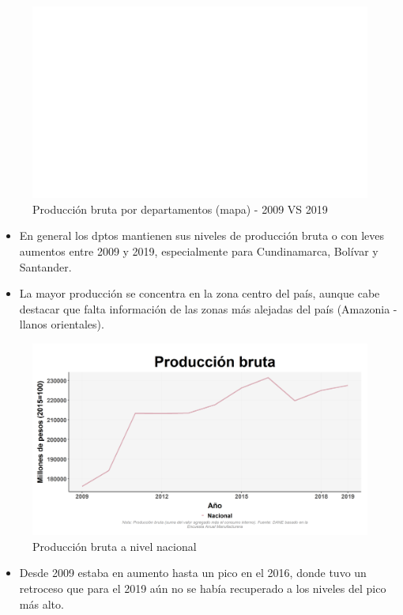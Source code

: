     \begin{figure}[H]
        \caption{Producción bruta por departamentos (mapa) - 2009 VS 2019 \label{map_result_2} }
        \begin{center}
        \includegraphics[width=\textwidth,keepaspectratio]{img/var_223_map.png}
        \end{center}
    \end{figure}
            \begin{itemize}
                    \item En general los dptos mantienen sus niveles de producción bruta o con leves aumentos entre 2009 y 2019, especialmente para Cundinamarca, Bolívar y Santander.
                    \item La mayor producción se concentra en la zona centro del país, aunque cabe destacar que falta información de las zonas más alejadas del país (Amazonia - llanos orientales).
                    \end{itemize}

    \begin{figure}[H]
        \caption{Producción bruta a nivel nacional \label{map_result_2} }
        \begin{center}
        \includegraphics[width=\textwidth,keepaspectratio]{img/var_224_trend.png}
        \end{center}
    \end{figure}
            \begin{itemize}
                    \item Desde 2009 estaba en aumento hasta un pico en el 2016, donde tuvo un retroceso que para el 2019 aún no se había recuperado a los niveles del pico más alto.
                    \end{itemize}

